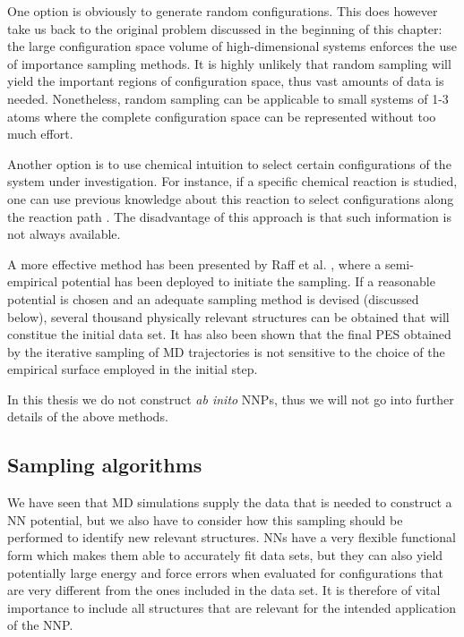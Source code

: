 \documentclass[twoside,english]{uiofysmaster}
\begin{document}
One option is obviously to generate random configurations. This does however take us back to the 
original problem discussed in the beginning of this chapter: the large configuration space volume of
high-dimensional systems enforces the use of importance sampling methods. 
It is highly unlikely that random sampling will yield the important regions of configuration space, thus 
vast amounts of data is needed. Nonetheless, random sampling can be applicable to small systems of 1-3 atoms where
the complete configuration space can be represented without too much effort. 

Another option is to use chemical intuition to select certain configurations of 
the system under investigation. 
For instance, if a specific chemical reaction is studied, one can use previous knowledge about this reaction to 
select configurations along the reaction path \cite{Ischtwan94}. The disadvantage of this approach is that
such information is not always available. 

A more effective method has been presented by Raff et al. \cite{Raff05}, where a semi-empirical
potential has been deployed to initiate the sampling. If a reasonable potential is chosen and an adequate
sampling method is devised (discussed below), several thousand physically relevant structures can be obtained
that will constitue the initial data set. It has also been shown \cite{Raff05} that the final PES obtained 
by the iterative sampling of MD trajectories is not sensitive to the choice of the empirical surface employed 
in the initial step. 

In this thesis we do not construct \textit{ab inito} NNPs, thus we will not go into further details
of the above methods. 

\subsection{Sampling algorithms}
We have seen that MD simulations supply the data that is needed to construct a NN potential, but we 
also have to consider how this sampling should be performed to identify new relevant structures.
NNs have a very flexible functional form which makes them able to accurately fit data sets, 
but they can also yield potentially large energy and force errors 
when evaluated for configurations that are very different from the ones included in the data set.
It is therefore of vital importance to include all structures that are relevant for the intended
application of the NNP.
\end{document}
